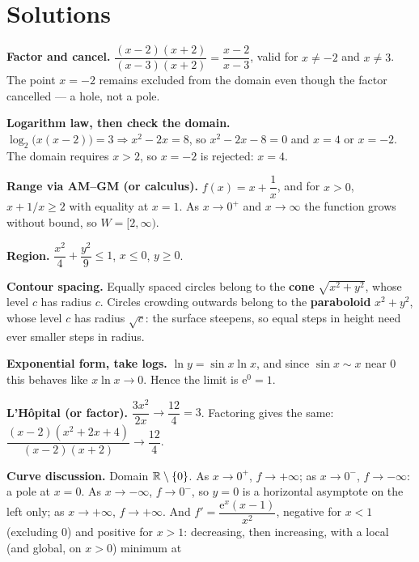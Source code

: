 \section{Solutions}

\begin{solutions}
  \item \textbf{Factor and cancel.}
        $\dfrac{(x-2)(x+2)}{(x-3)(x+2)}=\dfrac{x-2}{x-3}$, valid for
        $x\neq-2$ and $x\neq3$. The point $x=-2$ remains excluded from the
        domain even though the factor cancelled --- a hole, not a pole.
  \item \textbf{Logarithm law, then check the domain.}
        $\log_{2}\bigl(x(x-2)\bigr)=3\Rightarrow x^{2}-2x=8$, so
        $x^{2}-2x-8=0$ and $x=4$ or $x=-2$. The domain requires $x>2$, so
        $x=-2$ is rejected: \;$x=4$.
  \item \textbf{Range via AM--GM (or calculus).}
        $f(x)=x+\dfrac1x$, and for $x>0$, $x+1/x\ge2$ with equality at
        $x=1$. As $x\to0^{+}$ and $x\to\infty$ the function grows without
        bound, so $W=[2,\infty)$.
  \item \textbf{Region.} $\dfrac{x^{2}}{4}+\dfrac{y^{2}}{9}\le1$,
        \;$x\le0$, \;$y\ge0$.
  \item \textbf{Contour spacing.} Equally spaced circles belong to the
        \textbf{cone} $\sqrt{x^{2}+y^{2}}$, whose level $c$ has radius $c$.
        Circles crowding outwards belong to the \textbf{paraboloid}
        $x^{2}+y^{2}$, whose level $c$ has radius $\sqrt{c}$: the surface
        steepens, so equal steps in height need ever smaller steps in
        radius.
  \item \textbf{Exponential form, take logs.}
        $\ln y=\sin x\ln x$, and since $\sin x\sim x$ near $0$ this behaves
        like $x\ln x\to0$. Hence the limit is $\mathrm{e}^{0}=1$.
  \item \textbf{L'H\^opital (or factor).}
        $\dfrac{3x^{2}}{2x}\to\dfrac{12}{4}=3$. Factoring gives the same:
        $\dfrac{(x-2)(x^{2}+2x+4)}{(x-2)(x+2)}\to\dfrac{12}{4}$.
  \item \textbf{Curve discussion.} Domain $\mathbb{R}\setminus\{0\}$. As
        $x\to0^{+}$, $f\to+\infty$; as $x\to0^{-}$, $f\to-\infty$: a pole
        at $x=0$. As $x\to-\infty$, $f\to0^{-}$, so $y=0$ is a horizontal
        asymptote on the left only; as $x\to+\infty$, $f\to+\infty$. And
        $f'=\dfrac{\mathrm{e}^{x}(x-1)}{x^{2}}$, negative for $x<1$
        (excluding $0$) and positive for $x>1$: decreasing, then
        increasing, with a local (and global, on $x>0$) minimum at

\end{solutions}
